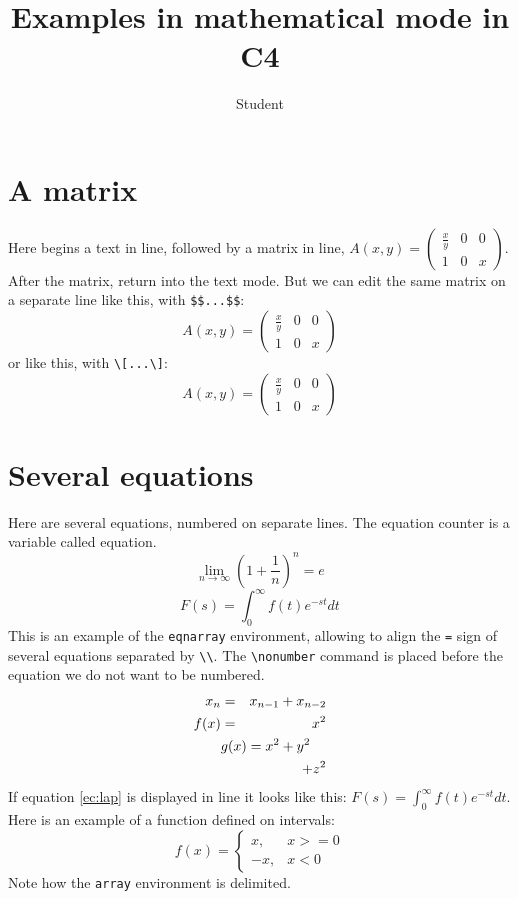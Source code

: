 \documentclass{article}
\title{Examples in mathematical mode in C4}
\author{Student}
\begin{document}
\maketitle
\section{A matrix}
Here begins a text in line, followed by a matrix in line,  
$A(x,y)=\left(
\begin{array}{ccc}
\frac{x}{y} & 0 & 0\\
1 & 0 & x
\end{array}
\right)$. After the matrix,  return into the text mode. But we can edit the same matrix on a separate line like this, with \verb+$$...$$+:
$$A(x,y)=\left(
\begin{array}{ccc}
\frac{x}{y} & 0 & 0\\
1 & 0 & x
\end{array}
\right)$$ or like this, with \verb+\[...\]+:
\[A(x,y)=\left(
\begin{array}{ccc}
\frac{x}{y} & 0 & 0\\
1 & 0 & x
\end{array}
\right)\]
\section{Several equations}
Here are several equations, numbered on separate lines. The equation counter is a variable called equation.
\begin{equation}\label{ec:e}
\lim_{n\rightarrow\infty}\left(1+\frac{1}{n}\right)^{n}=e
\end{equation}
\begin{equation}\label{ec:lap}
F(s)=\int_{0}^{\infty}f(t)e^{-st}dt
\end{equation}
This is an example of the \verb+eqnarray+ environment, allowing to align the \verb+=+ sign of several equations separated by \verb+\\+. The \verb+\nonumber+ command is placed before the equation we do not want to be numbered.
\begin{eqnarray}
x_n&=&x_{n-1}+x_{n-2}\\
\nonumber
f(x)&=&x^2\\
\nonumber
\lefteqn{g(x)=x^2+y^2}\\
& &+z^2
\end{eqnarray}
If equation \ref{ec:lap} is displayed in line it looks like this: $F(s)=\int_{0}^{\infty}f(t)e^{-st}dt$.
Here is an example of a function defined on intervals:
\begin{equation}
f(x)=\left\{
\begin{array}{rl}
x,&x>=0\\
-x,&x<0
\end{array}\right.
\end{equation}
Note how the \verb+array+ environment is delimited.
\end{document}
